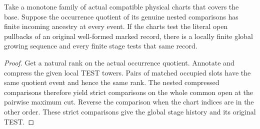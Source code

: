 \begin{theorem}
\label{hir:g8-ranked-nested-global-test}
\leanok
Take a monotone family of actual compatible physical charts that
covers the base. Suppose the occurrence quotient of its genuine
nested comparisons has finite incoming ancestry at every event.
If the charts test the literal open pullbacks of an original
well-formed marked record, there is a locally finite global
growing sequence and every finite stage tests that same record.
\end{theorem}
\begin{proof}
Get a natural rank on the actual occurrence quotient. Annotate and
compress the given local TEST towers. Pairs of matched occupied slots
have the same quotient event and hence the same rank. The nested
compressed comparisons therefore yield strict comparisons on the
whole common open at the pairwise maximum cut. Reverse the comparison
when the chart indices are in the other order. These strict comparisons
give the global stage history and its original TEST.
\end{proof}

